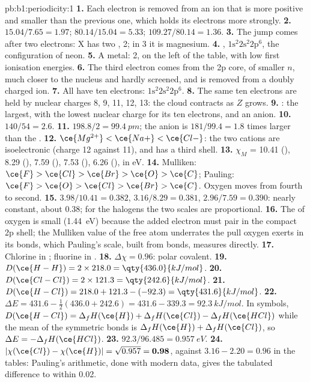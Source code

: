 \begin{solution}{pb:b1:periodicity:1}
\textbf{1.} Each electron is removed from an ion that is more positive and
smaller than the previous one, which holds its electrons more strongly.
\textbf{2.} $15.04/7.65 = 1.97$; $80.14/15.04 = 5.33$; $109.27/80.14 = 1.36$.
\textbf{3.} The jump comes after two electrons: X has two ,
 2; in  3 it is magnesium.
\textbf{4.} , $1\text{s}^2 2\text{s}^2 2\text{p}^6$, the
configuration of neon.
\textbf{5.} A metal:  2, on the left of the table, with low first
ionisation energies.
\textbf{6.} The third electron comes from the 2p core, of smaller $n$,
much closer to the nucleus and hardly screened, and is removed from a
doubly charged ion.
\textbf{7.} All have ten electrons: $1\text{s}^2 2\text{s}^2 2\text{p}^6$.
\textbf{8.} The same ten electrons are held by nuclear charges 8, 9, 11,
12, 13: the cloud contracts as $Z$ grows.
\textbf{9.} : the largest, with the lowest nuclear charge for
its ten electrons, and an anion.
\textbf{10.} $140/54 = 2.6$.
\textbf{11.} $198.8/2 = \qty{99.4}{pm}$; the anion is $181/99.4 = 1.8$
times larger than the .
\textbf{12.} $\ce{Mg^{2+}} < \ce{Na+} < \ce{Cl-}$: the two cations are
isoelectronic (charge 12 against 11), and  has a third shell.
\textbf{13.} $\chi_M$ = 10.41 (), 8.29 (), 7.59 (),
7.53 (), 6.26 (), in eV.
\textbf{14.} Mulliken: $\ce{F} > \ce{Cl} > \ce{Br} > \ce{O} > \ce{C}$;
Pauling: $\ce{F} > \ce{O} > \ce{Cl} > \ce{Br} > \ce{C}$. Oxygen moves
from fourth to second.
\textbf{15.} $3.98/10.41 = 0.382$, $3.16/8.29 = 0.381$, $2.96/7.59 =
0.390$: nearly constant, about 0.38; for the halogens the two scales are
proportional.
\textbf{16.} The  of oxygen is small (\qty{1.44}{eV})
because the added electron must pair in the compact 2p shell; the
Mulliken value of the free atom underrates the pull oxygen exerts in its
bonds, which Pauling's scale, built from bonds, measures directly.
\textbf{17.} Chlorine in ; fluorine in .
\textbf{18.} $\Delta\chi = 0.96$: polar covalent.
\textbf{19.} $D(\ce{H-H}) = 2 \times 218.0 = \qty{436.0}{kJ/mol}$.
\textbf{20.} $D(\ce{Cl-Cl}) = 2 \times 121.3 = \qty{242.6}{kJ/mol}$.
\textbf{21.} $D(\ce{H-Cl}) = 218.0 + 121.3 - (-92.3) = \qty{431.6}{kJ/mol}$.
\textbf{22.} $\Delta E = 431.6 - \tfrac12(436.0 + 242.6) = 431.6 - 339.3 =
\qty{92.3}{kJ/mol}$. In symbols, $D(\ce{H-Cl}) = \Delta_fH(\ce{H}) +
\Delta_fH(\ce{Cl}) - \Delta_fH(\ce{HCl})$ while the mean of the symmetric
bonds is $\Delta_fH(\ce{H}) + \Delta_fH(\ce{Cl})$, so $\Delta E =
-\Delta_fH(\ce{HCl})$.
\textbf{23.} $92.3/96.485 = \qty{0.957}{eV}$.
\textbf{24.} $|\chi(\ce{Cl}) - \chi(\ce{H})| = \sqrt{0.957} =
\textbf{0.98}$, against $3.16 - 2.20 = 0.96$ in the tables: Pauling's
arithmetic, done with modern data, gives the tabulated difference to
within 0.02.
\end{solution}

